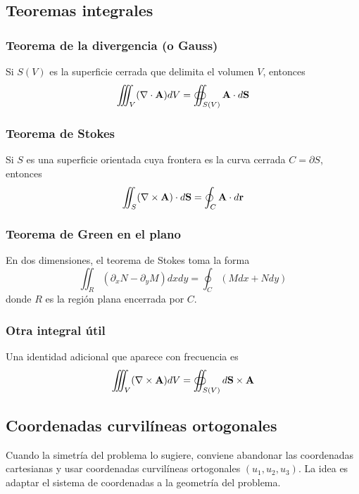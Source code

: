 \documentclass[]{article}
\numberwithin{equation}{section}
\begin{document}
\subsection{Teoremas integrales}
\subsubsection{Teorema de la divergencia (o Gauss)}
Si \(S(V)\) es la superficie cerrada que delimita el volumen \(V\), entonces
\begin{equation}
	\iiint_V (\nabla\cdot \mathbf{A})dV = \oiint_{S(V)}\mathbf{A}\cdot d\mathbf{S}
	\label{teo_div}
\end{equation}

\subsubsection{Teorema de Stokes}
Si \(S\) es una superficie orientada cuya frontera es la curva cerrada \(C = \partial S\), entonces
\begin{equation}
	\iint_S (\nabla\times\mathbf{A})\cdot d\mathbf{S} = \oint_{C}\mathbf{A}\cdot d\mathbf{r}
	\label{teo_sto}
\end{equation}

\subsubsection{Teorema de Green en el plano}
En dos dimensiones, el teorema de Stokes toma la forma
\begin{equation}
	\iint_R (\partial_x N - \partial_y M)dxdy = \oint_{C}(Mdx + Ndy)
	\label{teo_gre_plano}
\end{equation}
donde \(R\) es la región plana encerrada por \(C\).

\subsubsection{Otra integral útil}
Una identidad adicional que aparece con frecuencia es
\begin{equation}
	\iiint_V (\nabla\times \mathbf{A})dV = \oiint_{S(V)}d\mathbf{S}\times\mathbf{A}
	\label{teo_int}
\end{equation}

\subsection{Coordenadas curvilíneas ortogonales}
Cuando la simetría del problema lo sugiere, conviene abandonar las coordenadas cartesianas y usar 	coordenadas curvilíneas ortogonales \((u_1, u_2, u_3)\). La idea es adaptar el sistema de coordenadas a la 	geometría del problema.
\end{document}
